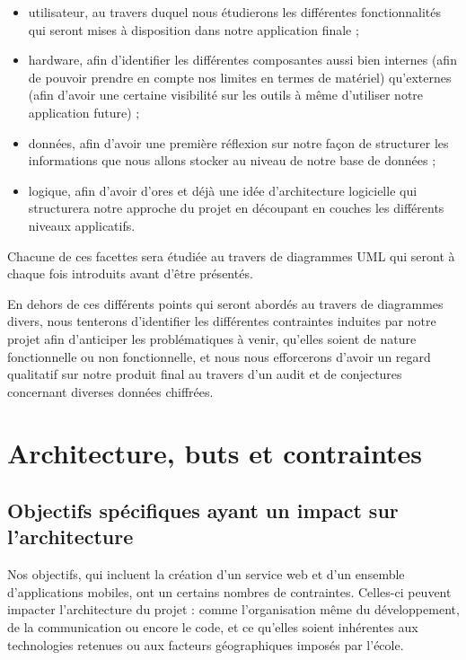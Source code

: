 \documentclass{life-fr}
\begin{document}
\begin{itemize}
      \item utilisateur, au travers duquel nous étudierons les différentes fonctionnalités qui seront mises à disposition dans notre application finale ;
      \item hardware, afin d'identifier les différentes composantes aussi bien internes (afin de pouvoir prendre en compte nos limites en termes de matériel) qu'externes (afin d'avoir une certaine visibilité sur les outils à même d'utiliser notre application future) ;
      \item données, afin d'avoir une première réflexion sur notre façon de structurer les informations que nous allons stocker au niveau de notre base de données ;
      \item logique, afin d'avoir d'ores et déjà une idée d'architecture logicielle qui structurera notre approche du projet en découpant en couches les différents niveaux applicatifs.
\end{itemize}

Chacune de ces facettes sera étudiée au travers de diagrammes UML qui seront à chaque fois introduits avant d'être présentés.

En dehors de ces différents points qui seront abordés au travers de diagrammes divers, nous tenterons d'identifier les différentes contraintes induites par notre projet afin d'anticiper les problématiques à venir, qu'elles soient de nature fonctionnelle ou non fonctionnelle, et nous nous efforcerons d'avoir un regard qualitatif sur notre produit final au travers d'un audit et de conjectures concernant diverses données chiffrées.


\chapter{Architecture, buts et contraintes}
\section{Objectifs spécifiques ayant un impact sur l’architecture}

Nos objectifs, qui incluent la création d'un service web et d'un ensemble d'applications mobiles, ont un certains nombres de contraintes. Celles-ci peuvent impacter l'architecture du projet : comme l'organisation même du développement, de la communication ou encore le code, et ce qu'elles soient inhérentes aux technologies retenues ou aux facteurs géographiques imposés par l'école.
\end{document}
